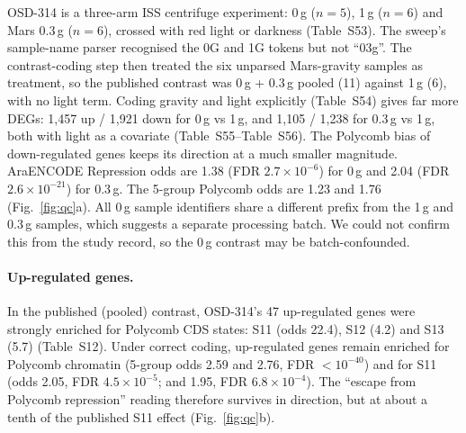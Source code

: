 \documentclass[11pt,a4paper]{article}
\newcommand{\Sx}[1]{Table~S#1}
\begin{document}
OSD-314 is a three-arm ISS centrifuge experiment: 0\,g ($n=5$), 1\,g ($n=6$) and Mars 0.3\,g ($n=6$),
crossed with red light or darkness (Table~S53). The sweep's sample-name parser recognised the 0G and 1G tokens but not
``03g''. The contrast-coding step then treated the six unparsed Mars-gravity samples as treatment, so the
published contrast was 0\,g + 0.3\,g pooled (11) against 1\,g (6), with no light term. Coding gravity and light
explicitly (\Sx{54}) gives far more DEGs: 1,457 up / 1,921 down for 0\,g vs 1\,g, and 1,105 / 1,238 for
0.3\,g vs 1\,g, both with light as a covariate (\Sx{55}--\Sx{56}).
The Polycomb bias of down-regulated genes keeps its direction at a much smaller magnitude. AraENCODE
Repression odds are 1.38 (FDR $2.7\times10^{-6}$) for 0\,g and 2.04 (FDR $2.6\times10^{-21}$) for 0.3\,g. The 5-group
Polycomb odds are 1.23 and 1.76 (Fig.~\ref{fig:qc}a). All 0\,g sample identifiers share a different prefix from the
1\,g and 0.3\,g samples, which suggests a separate processing batch. We could not confirm this from the study record,
so the 0\,g contrast may be batch-confounded.

\paragraph{Up-regulated genes.} In the published (pooled) contrast, OSD-314's 47 up-regulated genes were
strongly enriched for Polycomb CDS states: S11 (odds 22.4), S12 (4.2) and S13 (5.7) (\Sx{12}). Under correct coding,
up-regulated genes remain enriched for Polycomb chromatin (5-group odds 2.59 and 2.76, FDR $<10^{-40}$) and for S11
(odds 2.05, FDR $4.5\times10^{-5}$; and 1.95, FDR $6.8\times10^{-4}$). The ``escape from Polycomb repression'' reading
therefore survives in direction, but at about a tenth of the published S11 effect (Fig.~\ref{fig:qc}b).
\end{document}
